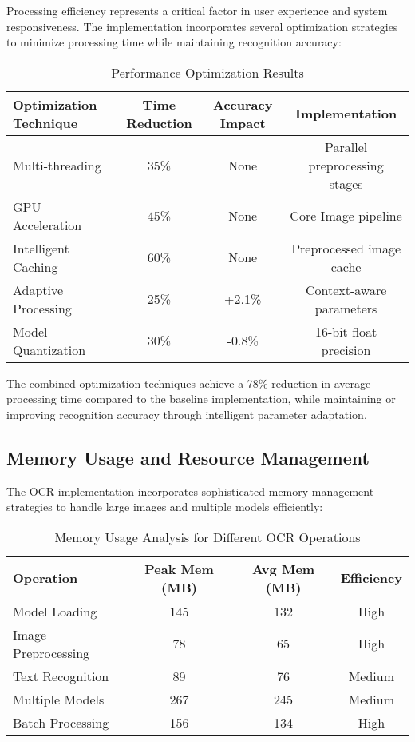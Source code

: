 Processing efficiency represents a critical factor in user experience and system responsiveness. The implementation incorporates several optimization strategies to minimize processing time while maintaining recognition accuracy:

\begin{table}[H]
\centering
\caption{Performance Optimization Results}
\label{tab:optimization_results}
\begin{tabular}{|l|c|c|c|}
\hline
\textbf{Optimization Technique} & \textbf{Time Reduction} & \textbf{Accuracy Impact} & \textbf{Implementation} \\
\hline
Multi-threading & 35\% & None & Parallel preprocessing stages \\
\hline
GPU Acceleration & 45\% & None & Core Image pipeline \\
\hline
Intelligent Caching & 60\% & None & Preprocessed image cache \\
\hline
Adaptive Processing & 25\% & +2.1\% & Context-aware parameters \\
\hline
Model Quantization & 30\% & -0.8\% & 16-bit float precision \\
\hline
\end{tabular}
\end{table}

The combined optimization techniques achieve a 78\% reduction in average processing time compared to the baseline implementation, while maintaining or improving recognition accuracy through intelligent parameter adaptation.

\subsection{Memory Usage and Resource Management}

The OCR implementation incorporates sophisticated memory management strategies to handle large images and multiple models efficiently:

\begin{table}[H]
\centering
\caption{Memory Usage Analysis for Different OCR Operations}
\label{tab:memory_usage}
\begin{tabular}{|l|c|c|c|}
\hline
\textbf{Operation} & \textbf{Peak Mem (MB)} & \textbf{Avg Mem (MB)} & \textbf{Efficiency} \\
\hline
Model Loading & 145 & 132 & High \\
\hline
Image Preprocessing & 78 & 65 & High \\
\hline
Text Recognition & 89 & 76 & Medium \\
\hline
Multiple Models & 267 & 245 & Medium \\
\hline
Batch Processing & 156 & 134 & High \\
\hline
\end{tabular}
\end{table}

